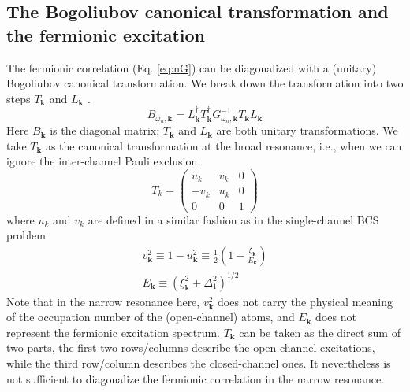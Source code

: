 \documentclass[reprint,pra]{revtex4-1}
\newcommand{\vk}{\ensuremath{\mathbf{k}}}
\newcommand{\nth}[1]{\ensuremath{\frac{1}{#1}}}
\newcommand{\br}[1]{\ensuremath{\left(#1\right)}}
\newcommand{\mtrx}[1]{\ensuremath{\begin{pmatrix}#1\end{pmatrix}}}
\newcommand{\dg}{\ensuremath{\dagger}}
\begin{document}
 \subsection{The Bogoliubov canonical transformation and the  fermionic excitation\label{sec:fermionic}}
 The fermionic correlation (Eq. \ref{eq:nG}) can be diagonalized with a (unitary) Bogoliubov canonical transformation.  We  break down the transformation into two steps $T_{\vk}$ and $L_{\vk}$ . 
\begin{equation}\label{eq:pathInt2:B}
B_{\omega_{n},\vk}=L_{\vk}^{\dg}T_{\vk}^{\dg}G_{\omega_{n},\vk}^{-1}T_{\vk}L_{\vk}
\end{equation} 
Here $B_{\vk}$ is the diagonal matrix; $T_{\vk}$ and $L_{\vk}$ are both unitary transformations.  We take $T_{\vk}$ as the canonical transformation at the broad resonance, i.e., when we can ignore the inter-channel Pauli exclusion. 
\begin{equation}\label{eq:pathInt2:T}
T_k=\mtrx{u_k&v_k&0\\-v_k&u_k&0\\0&0&1}
\end{equation}	
where $u_{k}$ and $v_{k}$ are defined in a similar fashion as in the single-channel BCS  problem
\begin{gather}
v_{\vk}^{2}\equiv1-u_{\vk}^{2}\equiv\nth{2}\br{1-\frac{\xi_{\vk}}{E_{\vk}}}\\
E_{\vk}\equiv(\xi_{\vk}^{2}+\Delta_{1}^{2})^{1/2}
\end{gather}
 Note that in the narrow resonance here,  $v_{\vk}^{2}$  does not carry the physical meaning of the occupation number of the (open-channel) atoms, and $E_{\vk}$   does not represent the fermionic excitation spectrum. $T_{\vk}$ can be taken as the direct sum of two parts, the first two rows/columns describe the open-channel excitations, while the third row/column describes the closed-channel ones.  It nevertheless is not sufficient to diagonalize the fermionic correlation in the narrow resonance.  
\end{document}

